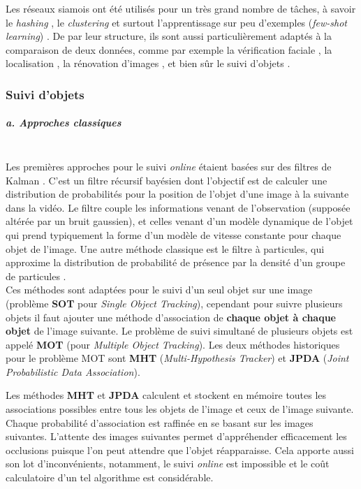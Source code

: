 \documentclass[10pt,twocolumn,letterpaper,french]{article}
\begin{document}
Les réseaux siamois ont été utilisés pour un très grand nombre de tâches, à savoir le \textit{hashing} \cite{hashing}, le \textit{clustering} \cite{clustering} et surtout l'apprentissage sur peu d'exemples (\textit{few-shot learning}) \cite{one-shot}. De par leur structure, ils sont aussi particulièrement adaptés à la comparaison de deux données, comme par exemple la vérification faciale \cite{face_verif}, la localisation \cite{tompson2015efficient}, la rénovation d'images \cite{gordo2017endtoend}, et bien sûr le suivi d'objets \cite{siamfc, siamfcplusplus, siamMask, trackRCNN}.

\subsubsection*{Suivi d'objets}

\subparagraph{a. Approches classiques\\\\} 

Les premières approches pour le suivi \textit{online} étaient basées sur des filtres de Kalman \cite{Kalman}. C'est un filtre récursif bayésien dont l'objectif est de calculer une distribution de probabilités pour la position de l'objet d'une image à la suivante dans la vidéo. Le filtre couple les informations venant de l'observation (supposée altérée par un bruit gaussien), et celles venant d'un modèle dynamique de l'objet qui prend typiquement la forme d'un modèle de vitesse constante pour chaque objet de l'image. Une autre méthode classique est le filtre à particules, qui approxime la distribution de probabilité de présence par la densité d'un groupe de particules \cite{particule}. \\

Ces méthodes sont adaptées pour le suivi d'un seul objet sur une image (problème \textbf{SOT} pour \textit{Single Object Tracking}), cependant pour suivre plusieurs objets il faut ajouter une méthode d'association de \textbf{chaque objet à chaque objet} de l'image suivante. Le problème de suivi simultané de plusieurs objets est appelé \textbf{MOT} (pour \textit{Multiple Object Tracking}). Les deux méthodes historiques pour le problème MOT sont \textbf{MHT} (\textit{Multi-Hypothesis Tracker}) et \textbf{JPDA} (\textit{Joint Probabilistic Data Association}).

Les méthodes \textbf{MHT} \cite{chenouardMHT, MHTrevisited} et \textbf{JPDA} \cite{FortmannJPDA, JPDArevisited} calculent et stockent en mémoire toutes les associations possibles entre tous les objets de l'image et ceux de l'image suivante. Chaque probabilité d'association est raffinée en se basant sur les images suivantes. L'attente des images suivantes permet d'appréhender efficacement les occlusions puisque l'on peut attendre que l'objet réapparaisse. Cela apporte aussi son lot d'inconvénients, notamment, le suivi \textit{online} est impossible et le coût calculatoire d'un tel algorithme est considérable.
\end{document}
